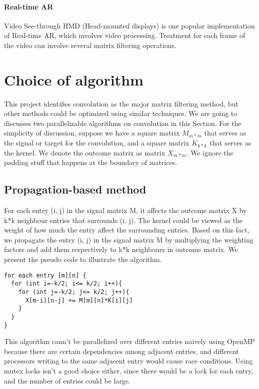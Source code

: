 \documentclass[letterpaper, 10 pt, conference]{ieeeconf}  %
\begin{document}
\paragraph{Real-time AR}
Video See-through HMD (Head-mounted displays) is one popular implementation of Real-time AR, which involves video processing. Treatment for each frame of the video can involve several matrix filtering operations.



\section{Choice of algorithm}

This project identifies convolution as the major matrix filtering method, but other methods could be optimized using similar techniques. We are going to discusses two parallelizable algorithms on convolution in this Section. For the simplicity of discussion, suppose we have a square matrix $M_{m*m}$ that serves as the signal or target for the convolution, and a square matrix $K_{k*k}$ that serves as the kernel. We denote the outcome matrix as matrix $X_{m*m}$. We ignore the padding stuff that happens at the boundary of matrices. 

\subsection{Propagation-based method}
For each entry (i, j) in the signal matrix M, it affects the outcome matrix X by k*k neighbour entries that surrounds (i, j). The kernel could be viewed as the weight of how much the entry affect the surrounding entries. Based on this fact, we propagate the entry (i, j) in the signal matrix M by multiplying the weighting factors and add them respectively to  k*k neighbours in outcome matrix.
We present the pseudo code to illustrate the algorithm.

\begin{lstlisting}
for each entry [m][n] {
  for (int i=-k/2; i<= k/2; i++){
    for (int j=-k/2; j<= k/2; j++){
      X[m-i][n-j] += M[m][n]*K[i][j]
    }
  }
}
\end{lstlisting}


This algorithm cann't be parallelized over different entries naively using OpenMP because there are certain dependencies among adjacent entries, and different processors writing to the same adjacent entry would cause race conditions. Using mutex locks isn't a good choice either, since there would be a lock for each entry, and the number of entries could be large.
\end{document}
